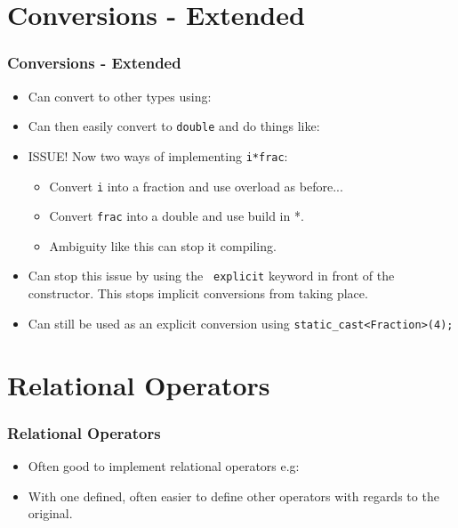 \documentclass{beamer}
\begin{document}
\section{Conversions - Extended}
\begin{frame}
\frametitle{Conversions - Extended}
\begin{itemize}
\item Can convert to other types using:
\dob
\vspace{-0.25cm}
\item Can then easily convert to \texttt{double} and do things like:
\div
\vspace{-0.25cm}
\item ISSUE! Now two ways of implementing \texttt{i*frac}:
\begin{itemize}
\item Convert \texttt{i} into a fraction and use overload as before...
\item Convert \texttt{frac} into a double and use build in *.
\item Ambiguity like this can stop it compiling.
\end{itemize}
\item Can stop this issue by using the \texttt{\color{blue} explicit} keyword in front of the constructor. This stops implicit conversions from taking place.
\item Can still be used as an explicit conversion using \texttt{{\color{blue}static\_cast}<Fraction>(4);}
\end{itemize}
\end{frame}
\section{Relational Operators}
\begin{frame}
\frametitle{Relational Operators}
\begin{itemize}
\item Often good to implement relational operators e.g:
\rele
\item With one defined, often easier to define other operators with regards to the original.
\reln
\end{itemize}
\end{frame}
\end{document}
